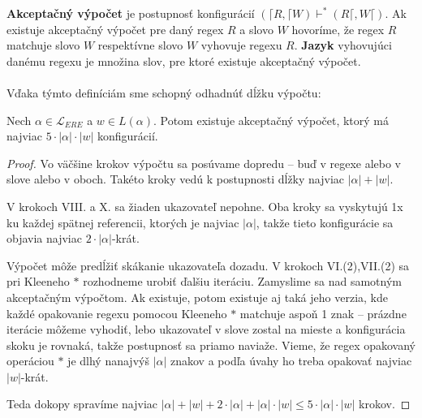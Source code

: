 \documentclass{svk_long_sk}
\def\el{\mathscr{L}_{ERE}}
\begin{document}
\textbf{Akceptačný výpočet} je postupnosť konfigurácií $(\lceil R, \lceil W) \vdash^* (R\lceil,
W\lceil)$. Ak existuje akceptačný výpočet pre daný regex $R$ a slovo $W$ hovoríme, že regex $R$ matchuje slovo $W$ respektívne slovo $W$ vyhovuje regexu $R$. \textbf{Jazyk} vyhovujúci danému regexu je množina slov, pre ktoré existuje akceptačný výpočet.
\\ \\ Vďaka týmto definíciám sme schopný odhadnúť dĺžku výpočtu:
\begin{lemma}
Nech $\alpha \in \el$ a $w \in L(\alpha)$. Potom existuje akceptačný výpočet, ktorý má najviac $5\cdot|\alpha|\cdot|w|$ konfigurácií.
\end{lemma}
\begin{proof}
Vo väčšine krokov výpočtu sa posúvame dopredu -- buď v regexe alebo v slove alebo v oboch. Takéto kroky vedú k postupnosti dĺžky najviac $|\alpha|+|w|$.

V krokoch VIII. a X. sa žiaden ukazovateľ nepohne. Oba kroky sa vyskytujú 1x ku každej spätnej referencii, ktorých je najviac $|\alpha|$, takže tieto konfigurácie sa objavia najviac $2\cdot|\alpha|$-krát.

Výpočet môže predĺžiť skákanie ukazovateľa dozadu. V krokoch VI.(2),VII.(2) sa pri Kleeneho $*$ rozhodneme urobiť ďalšiu iteráciu. Zamyslime sa nad samotným akceptačným výpočtom. Ak existuje, potom existuje aj taká jeho verzia, kde každé opakovanie regexu pomocou Kleeneho $*$ matchuje aspoň 1 znak -- prázdne iterácie môžeme vyhodiť, lebo ukazovateľ v slove zostal na mieste a konfigurácia skoku je rovnaká, takže postupnosť sa priamo naviaže. Vieme, že regex opakovaný operáciou $*$ je dlhý nanajvýš $|\alpha|$ znakov a podľa úvahy ho treba opakovať najviac $|w|$-krát.

Teda dokopy spravíme najviac $|\alpha|+|w|+2\cdot|\alpha|+|\alpha|\cdot|w| \leq 5\cdot|\alpha|\cdot|w|$ krokov.
\end{proof}
\end{document}
